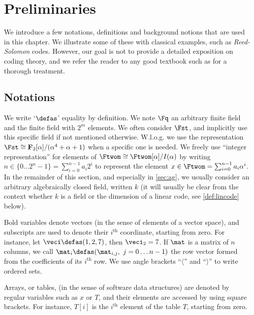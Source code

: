 \section{Preliminaries}
\label{not}

We introduce a few notations, definitions and background notions that are used in this chapter. We illustrate some of these with classical examples, such as \emph{Reed-Solomon} codes. However,
our goal is not to provide a detailed exposition on coding theory, and we refer the reader to any good textbook such as \cite{vanlint} for a thorough treatment.

\subsection{Notations}
We write `$\defas$' equality by definition.
We note $\Fq$ an arbitrary finite field and \Ftwom the finite field with $2^m$ elements. We often consider $\Fst$, and implicitly use this specific field if not mentioned otherwise.
W.l.o.g. we use the representation
$\Fst \cong \mathbf{F}_2[\alpha]/(\alpha^4 + \alpha + 1)$ when a specific one is needed. We freely use ``integer representation'' for elements of $\Ftwom \cong \Ftwom[\alpha]/I(\alpha)$
by writing $n \in \{0\ldots2^n-1\} = \sum_{i = 0}^{n-1} a_i 2^i$ to represent the element
$x \in \Ftwom = \sum_{i = 0}^{n-1} a_i \alpha^i$. In the remainder of this section, and especially in \autoref{sec:ag}, we usually consider an arbitrary algebraically closed field, written $k$
(it will usually be clear from the context whether $k$ is a field or the dimension of a linear code, see \autoref{def:lincode} below).

Bold variables denote vectors (in the sense of elements of a vector space), and subscripts are used to denote their $i^\text{th}$ coordinate, starting from zero. For instance,
let $\veci \defas (1, 2, 7)$, then  $\veci_2 = 7$.
If $\mat$ is a matrix of $n$ columns, we call $\mat_i \defas (\mat_{i,j},~j = 0\ldots n - 1)$ the row vector formed from the coefficients of
its $i^\text{th}$ row.
We use angle brackets ``$\langle$'' and ``$\rangle$'' to write ordered sets.

Arrays, or tables, (in the sense of software data structures) are denoted by regular variables such as $x$ or $T$, and their elements are accessed by using square brackets.
For instance, $T[i]$ is the $i^\text{th}$ element of the table $T$, starting from zero.


